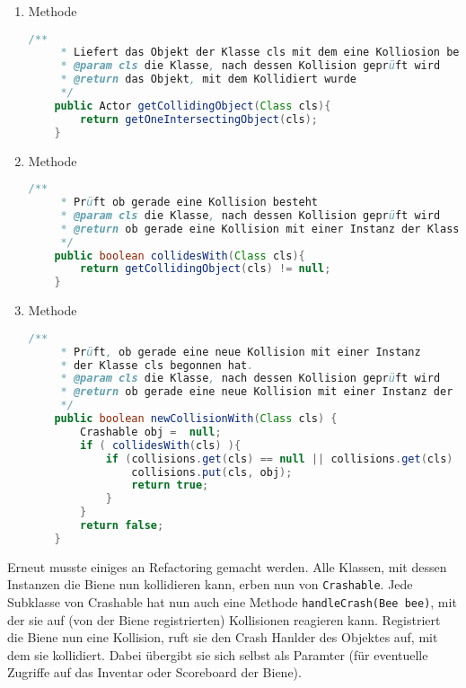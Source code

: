 \documentclass{pi1}
\begin{document}
\begin{enumerate}

\item
Methode
\begin{lstlisting}[caption={\emph{getCollidingObject(Class cls)}-Methode}, firstnumber=25, language=Java]
/**
     * Liefert das Objekt der Klasse cls mit dem eine Kolliosion besteht.
     * @param cls die Klasse, nach dessen Kollision geprüft wird
     * @return das Objekt, mit dem Kollidiert wurde
     */
    public Actor getCollidingObject(Class cls){
        return getOneIntersectingObject(cls);
    }
\end{lstlisting}

\item
Methode
\begin{lstlisting}[caption={\emph{collidesWith(Class cls)}-Methode}, firstnumber=25, language=Java]
/**
     * Prüft ob gerade eine Kollision besteht
     * @param cls die Klasse, nach dessen Kollision geprüft wird
     * @return ob gerade eine Kollision mit einer Instanz der Klasse cls besteht
     */
    public boolean collidesWith(Class cls){
        return getCollidingObject(cls) != null;
    }
\end{lstlisting}

\item
Methode
\begin{lstlisting}[caption={\emph{newCollisionWith(Class cls)}-Methode}, firstnumber=25, language=Java]
/**
     * Prüft, ob gerade eine neue Kollision mit einer Instanz
     * der Klasse cls begonnen hat.
     * @param cls die Klasse, nach dessen Kollision geprüft wird
     * @return ob gerade eine neue Kollision mit einer Instanz der Klasse cls begonnen hat
     */
    public boolean newCollisionWith(Class cls) {
        Crashable obj =  null;
        if ( collidesWith(cls) ){
            if (collisions.get(cls) == null || collisions.get(cls) != obj ){
                collisions.put(cls, obj);
                return true;
            }
        } 
        return false;
    }
\end{lstlisting}

\end{enumerate}

Erneut musste einiges an Refactoring gemacht werden. Alle Klassen, mit dessen Instanzen die Biene nun kollidieren kann, erben nun von \texttt{Crashable}. Jede Subklasse von Crashable hat nun auch eine Methode \texttt{handleCrash(Bee bee)}, mit der sie auf (von der Biene registrierten) Kollisionen reagieren kann. Registriert die Biene nun eine Kollision, ruft sie den Crash Hanlder des Objektes auf, mit dem sie kollidiert. Dabei übergibt sie sich selbst als Paramter (für eventuelle Zugriffe auf das Inventar oder Scoreboard der Biene).
\end{document}

